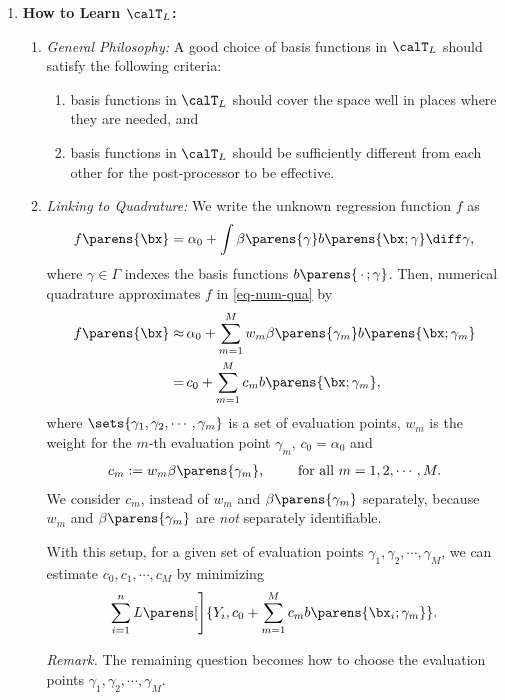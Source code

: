 \documentclass[12pt]{article}
\begin{document}
\begin{enumerate}[label=\textbf{\arabic*.}]
	\item \textbf{How to Learn $\calT_L$:} 
	\begin{enumerate}
		\item \textit{General Philosophy:} A good choice of basis functions in $\calT_L$ should satisfy the following criteria: 
		\begin{enumerate}
			\item basis functions in $\calT_L$ should cover the space well in places where they are needed, and 
			\item basis functions in $\calT_L$ should be sufficiently different from each other for the post-processor to be effective. 
		\end{enumerate}
		
		\item \textit{Linking to Quadrature:} We write the unknown regression function $f$ as 
		\begin{align}\label{eq-num-qua}
			f \parens{\bx} = \alpha_0 + \int \beta \parens{\gamma} b \parens{\bx; \gamma} \diff \gamma, 
		\end{align}
		where $\gamma \in \Gamma$ indexes the basis functions $b \parens{\,\cdot\,; \gamma}$. Then, numerical quadrature approximates $f$ in \eqref{eq-num-qua} by 
		\begin{align*}
			f \parens{\bx} \approx & \, \alpha_0 + \sum_{m=1}^M w_m \beta \parens{\gamma_m} b \parens{\bx; \gamma_m} \\ 
			= & \, c_0 + \sum_{m=1}^M c_m b \parens{\bx; \gamma_m}, 
		\end{align*}
		where $\sets{\gamma_1, \gamma_2, \cdots, \gamma_m}$ is a set of evaluation points, $w_m$ is the weight for the $m$-th evaluation point $\gamma_m$, $c_0 = \alpha_0$ and 
		\begin{align*}
			c_m := w_m \beta \parens{\gamma_m}, \qquad \text{ for all } m = 1, 2, \cdots, M. 
		\end{align*}
		We consider $c_m$, instead of $w_m$ and $\beta \parens{\gamma_m}$ separately, because $w_m$ and $\beta \parens{\gamma_m}$ are \emph{not} separately identifiable. 
		
		With this setup, for a given set of evaluation points $\gamma_1, \gamma_2, \cdots, \gamma_M$, we can estimate $c_0, c_1, \cdots, c_M$ by minimizing 
		\begin{align*}
			\sum_{i=1}^n L \parens[\Bigg]{Y_i, c_0 + \sum_{m=1}^M c_m b \parens{\bx_i; \gamma_m}}. 
		\end{align*}
		
		\textit{Remark.} The remaining question becomes how to choose the evaluation points $\gamma_1, \gamma_2, \cdots, \gamma_M$. 
		

\end{enumerate}
\end{enumerate}
\end{document}

